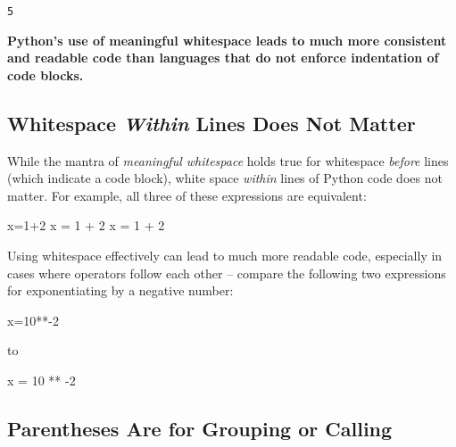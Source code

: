 \documentclass[
  letterpaper,
  DIV=11,
  numbers=noendperiod]{scrartcl}
\newenvironment{Shaded}{\begin{snugshade}}{\end{snugshade}}
\newcommand{\DecValTok}[1]{\textcolor[rgb]{0.68,0.00,0.00}{#1}}
\newcommand{\NormalTok}[1]{\textcolor[rgb]{0.00,0.23,0.31}{#1}}
\newcommand{\OperatorTok}[1]{\textcolor[rgb]{0.37,0.37,0.37}{#1}}
\begin{document}
\begin{verbatim}
5
\end{verbatim}

\textbf{Python's use of meaningful whitespace leads to much more
consistent and readable code than languages that do not enforce
indentation of code blocks.}

\hypertarget{whitespace-within-lines-does-not-matter}{%
\subsection{\texorpdfstring{Whitespace \emph{Within} Lines Does Not
Matter}{Whitespace Within Lines Does Not Matter}}\label{whitespace-within-lines-does-not-matter}}

While the mantra of \emph{meaningful whitespace} holds true for
whitespace \emph{before} lines (which indicate a code block), white
space \emph{within} lines of Python code does not matter. For example,
all three of these expressions are equivalent:

\begin{Shaded}
\begin{Highlighting}[]
\NormalTok{x}\OperatorTok{=}\DecValTok{1}\OperatorTok{+}\DecValTok{2}
\NormalTok{x }\OperatorTok{=} \DecValTok{1} \OperatorTok{+} \DecValTok{2}
\NormalTok{x             }\OperatorTok{=}        \DecValTok{1}    \OperatorTok{+}                \DecValTok{2}
\end{Highlighting}
\end{Shaded}

Using whitespace effectively can lead to much more readable code,
especially in cases where operators follow each other -- compare the
following two expressions for exponentiating by a negative number:

\begin{Shaded}
\begin{Highlighting}[]
\NormalTok{x}\OperatorTok{=}\DecValTok{10}\OperatorTok{**{-}}\DecValTok{2}
\end{Highlighting}
\end{Shaded}

to

\begin{Shaded}
\begin{Highlighting}[]
\NormalTok{x }\OperatorTok{=} \DecValTok{10} \OperatorTok{**} \OperatorTok{{-}}\DecValTok{2}
\end{Highlighting}
\end{Shaded}

\hypertarget{parentheses-are-for-grouping-or-calling}{%
\subsection{Parentheses Are for Grouping or
Calling}\label{parentheses-are-for-grouping-or-calling}}
\end{document}
